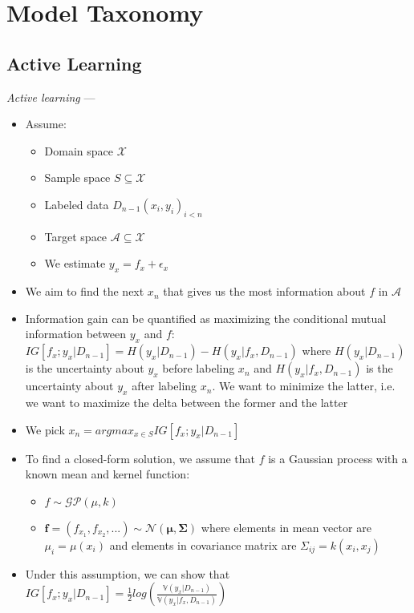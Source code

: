 \section{Model Taxonomy}
\subsection*{Active Learning}

\emph{Active learning} ---
\begin{itemize}
    \item Assume:
    \begin{itemize}
        \item Domain space $\mathcal{X}$ 
        \item Sample space $S \subseteq \mathcal{X}$
        \item Labeled data $D_{n-1} {(x_i, y_i)}_{i < n}$
        \item Target space $\mathcal{A} \subseteq \mathcal{X}$
        \item We estimate $y_x = f_x + \epsilon_x$
    \end{itemize}
    \item We aim to find the next $x_n$ that gives us the most information about $f$ in $\mathcal{A}$
    \item Information gain can be quantified as maximizing the conditional mutual information between $y_x$ and $f$: $IG [ f_x; y_x | D_{n-1} ] = H(y_x | D_{n-1}) - H(y_x | f_x, D_{n-1})$ where $H(y_x | D_{n-1})$ is the uncertainty about $y_x$ before labeling $x_n$ and $H(y_x | f_x, D_{n-1})$ is the uncertainty about $y_x$ after labeling $x_n$. We want to minimize the latter, i.e. we want to maximize the delta between the former and the latter
    \item We pick $x_n = argmax_{x \in S} IG [ f_x; y_x | D_{n-1} ]$ 
    \item To find a closed-form solution, we assume that $f$ is a Gaussian process with a known mean and kernel function:
    \begin{itemize}
        \item $f \sim \mathcal{G}\mathcal{P} (\mu, k)$
        \item $\boldsymbol{f} = (f_{x_1}, f_{x_2}, ...) \sim \mathcal{N} (\boldsymbol{\mu}, \boldsymbol{\Sigma})$ where elements in mean vector are $\mu_i = \mu(x_i)$ and elements in covariance matrix are $\Sigma_{ij} = k(x_i,x_j)$
    \end{itemize}
    \item Under this assumption, we can show that $IG [ f_x; y_x | D_{n-1} ] = \frac{1}{2} log( \frac{ \mathbb{V} (y_x | D_{n-1}) }{ \mathbb{V} (y_x | f_x, D_{n-1}) } )$\\

\end{itemize}
